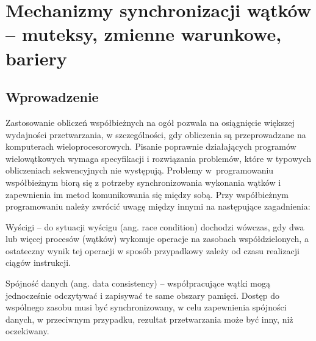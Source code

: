 \section{Mechanizmy synchronizacji wątków – muteksy, zmienne warunkowe, bariery}

\subsection{Wprowadzenie} 
Zastosowanie obliczeń współbieżnych na ogół pozwala na osiągnięcie większej wydajności przetwarzania, w szczególności, gdy obliczenia są przeprowadzane na komputerach wieloprocesorowych. Pisanie poprawnie działających programów wielowątkowych wymaga specyfikacji i rozwiązania problemów, które w typowych obliczeniach sekwencyjnych nie występują. Problemy w~programowaniu współbieżnym biorą się z potrzeby synchronizowania wykonania wątków i zapewnienia im metod komunikowania się między sobą. Przy współbieżnym programowaniu należy zwrócić uwagę między innymi na następujące zagadnienia:

\begin{myitemize} 
\item Wyścigi -- do sytuacji wyścigu (ang. race condition) dochodzi wówczas, gdy dwa lub więcej procesów (wątków) wykonuje operacje na zasobach współdzielonych, a ostateczny wynik tej operacji w sposób przypadkowy zależy od czasu realizacji ciągów instrukcji.
\item Spójność danych (ang. data consistency) -- współpracujące wątki mogą jednocześnie odczytywać i zapisywać te same obszary pamięci. Dostęp do wspólnego zasobu musi być synchronizowany, w celu zapewnienia spójności danych, w przeciwnym przypadku, rezultat przetwarzania może być inny, niż oczekiwany. 
\end{myitemize} 

